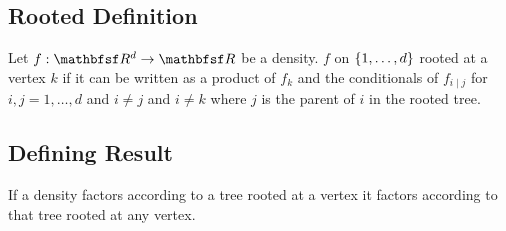 
\sbasic







































\sstart
{}



\subsection{Rooted Definition}

Let $f: \R^d \to \R$ be a density.
$f$
on $\{1, \dots, d\}$ rooted
at a vertex $k$ if it can be
written as a product of $f_k$
and the conditionals of $f_{i \mid j}$
for $i,j = 1, \dots, d$ and $i \neq j$
and $i \neq k$ where $j$ is the parent
of $i$ in the rooted tree.

\subsection{Defining Result}
\begin{prop}
If a density factors according
to a tree rooted at a vertex it
factors according to that tree rooted
at any vertex.
\end{prop}

